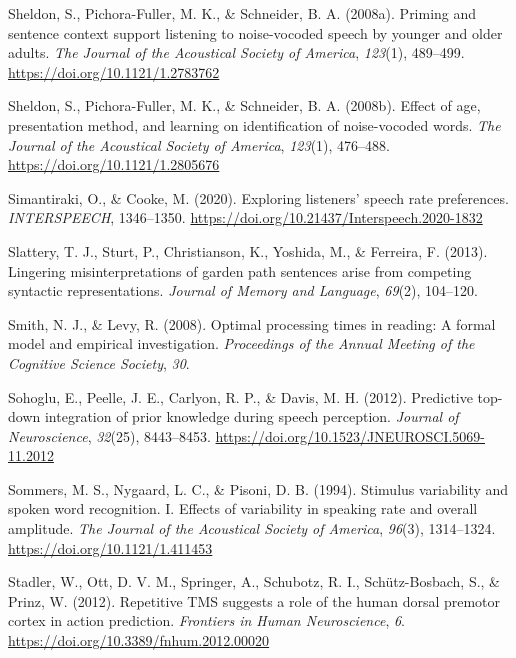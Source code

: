 \documentclass[a4paper, nobind]{templates/ociamthesis}
\newlength{\cslhangindent}
\newenvironment{CSLReferences}[2] %
 {%
  \setlength{\parindent}{0pt}
  \ifodd #1
  \let\oldpar\par
  \def\par{\hangindent=\cslhangindent\oldpar}
  \fi
  \setlength{\parskip}{1mm}
  \setlength{\baselineskip}{6mm}
 }%
 {}
\begin{document}
\begin{CSLReferences}{1}{0}
\leavevmode{}%
Sheldon, S., Pichora-Fuller, M. K., \& Schneider, B. A. (2008a). Priming and sentence context support listening to noise-vocoded speech by younger and older adults. \emph{The Journal of the Acoustical Society of America}, \emph{123}(1), 489--499. \url{https://doi.org/10.1121/1.2783762}

\leavevmode{}%
Sheldon, S., Pichora-Fuller, M. K., \& Schneider, B. A. (2008b). Effect of age, presentation method, and learning on identification of noise-vocoded words. \emph{The Journal of the Acoustical Society of America}, \emph{123}(1), 476--488. \url{https://doi.org/10.1121/1.2805676}

\leavevmode{}%
Simantiraki, O., \& Cooke, M. (2020). {Exploring listeners' speech rate preferences}. \emph{INTERSPEECH}, 1346--1350. \url{https://doi.org/10.21437/Interspeech.2020-1832}

\leavevmode{}%
Slattery, T. J., Sturt, P., Christianson, K., Yoshida, M., \& Ferreira, F. (2013). Lingering misinterpretations of garden path sentences arise from competing syntactic representations. \emph{Journal of Memory and Language}, \emph{69}(2), 104--120.

\leavevmode{}%
Smith, N. J., \& Levy, R. (2008). Optimal processing times in reading: A formal model and empirical investigation. \emph{Proceedings of the Annual Meeting of the Cognitive Science Society}, \emph{30}.

\leavevmode{}%
Sohoglu, E., Peelle, J. E., Carlyon, R. P., \& Davis, M. H. (2012). {Predictive top-down integration of prior knowledge during speech perception}. \emph{Journal of Neuroscience}, \emph{32}(25), 8443--8453. \url{https://doi.org/10.1523/JNEUROSCI.5069-11.2012}

\leavevmode{}%
Sommers, M. S., Nygaard, L. C., \& Pisoni, D. B. (1994). Stimulus variability and spoken word recognition. I. Effects of variability in speaking rate and overall amplitude. \emph{The Journal of the Acoustical Society of America}, \emph{96}(3), 1314--1324. \url{https://doi.org/10.1121/1.411453}

\leavevmode{}%
Stadler, W., Ott, D. V. M., Springer, A., Schubotz, R. I., Schütz-Bosbach, S., \& Prinz, W. (2012). Repetitive TMS suggests a role of the human dorsal premotor cortex in action prediction. \emph{Frontiers in Human Neuroscience}, \emph{6}. \url{https://doi.org/10.3389/fnhum.2012.00020}


\end{CSLReferences}
\end{document}

